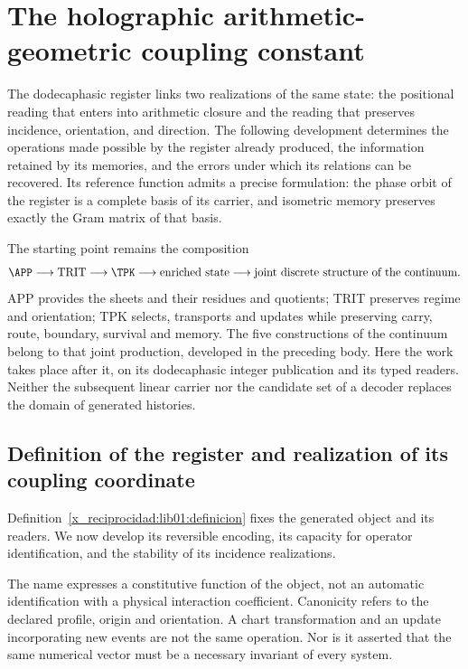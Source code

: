 \chapter{The holographic arithmetic-geometric coupling constant}
\label{x_reciprocidad:lib01:acoplamiento}

The dodecaphasic register links two realizations of the same state: the positional reading that enters into arithmetic closure and the reading that preserves incidence, orientation, and direction. The following development determines the operations made possible by the register already produced, the information retained by its memories, and the errors under which its relations can be recovered.
Its reference function admits a precise formulation: the phase orbit of the register is a complete basis of its carrier, and isometric memory preserves exactly the Gram matrix of that basis.

The starting point remains the composition
\[
 \APP\longrightarrow\mathrm{TRIT}\longrightarrow\TPK
 \longrightarrow\text{enriched state}
 \longrightarrow\text{joint discrete structure of the continuum}.
\]
APP provides the sheets and their residues and quotients; TRIT preserves regime and
orientation; TPK selects, transports and updates while preserving carry,
route, boundary, survival and memory. The five constructions of the
continuum belong to that joint production, developed in the preceding
body. Here the work takes place after it, on its dodecaphasic integer
publication and its typed readers. Neither the subsequent linear carrier nor the
candidate set of a decoder replaces the domain of
generated histories.

\section{Definition of the register and realization of its coupling coordinate}
\label{x_reciprocidad:lib01:registro}

Definition~\ref{x_reciprocidad:lib01:definicion} fixes the generated object and its readers. We now develop its reversible encoding, its capacity for operator identification, and the stability of its incidence realizations.

The name expresses a constitutive function of the object, not an
automatic identification with a physical interaction coefficient.
Canonicity refers to the declared profile, origin and orientation. A
chart transformation and an update incorporating new events
are not the same operation. Nor is it asserted that the same numerical vector
must be a necessary invariant of every system.

